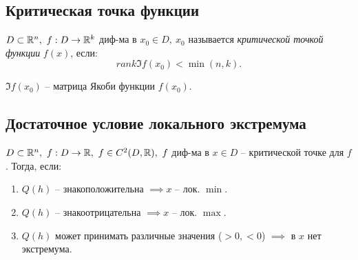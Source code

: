 \newpage

\subsection{Критическая точка функции}

\begin{definition}
    $ D \subset \mathbb{R}^n, \ f:D \rightarrow\mathbb{R}^k $ диф-ма в $ x_0 \in D, \ x_0 $ называется \emph{критической точкой функции} $ f(x) $, если:
    \[
        rank \mathfrak{I} f(x_0) < \min(n,k).
    \]
\end{definition}

\begin{note}
    $ \mathfrak{I}f(x_0) $ -- матрица Якоби функции $ f(x_0) $.
\end{note}

\subsection{Достаточное условие локального экстремума}

\begin{theorem}
    $ D \subset \mathbb{R}^n, \ f: D \rightarrow \mathbb{R}, \ f \in C^2(D,\mathbb{R}), \ f$ диф-ма в $x \in D $ -- критической точке для $ f $. Тогда, если:
    \begin{enumerate}
        \item $Q(h)$ -- знакоположительна $\implies x$ -- лок. $ \min $.
        \item $Q(h)$ -- знакоотрицательна $\implies x$ -- лок. $ \max $.
        \item $Q(h)$ может принимать различные значения ($>0, < 0$) $\implies $ в $ x$ нет экстремума.
    \end{enumerate}
\end{theorem}

